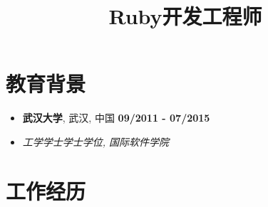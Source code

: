 \documentclass[UTF8, 12pt, a4paper,sans]{moderncv}       %
\title{Ruby开发工程师}
\begin{document}
    \makecvtitle
    \vspace{-38pt}

    \section{教育背景}
    \begin{itemize}
        \item{\textbf{武汉大学}, {武汉, 中国} \hfill\textbf{09/2011 - 07/2015}}
    \end{itemize}

    \begin{itemize}
        \item{\textit{工学学士学士学位, 国际软件学院}}
    \end{itemize}

    \vspace{-8pt}


    \section{工作经历}
\end{document}
